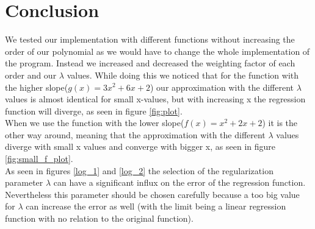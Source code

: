 \documentclass[12pt]{article}
\begin{document}
\section{Conclusion}
We tested our implementation with different functions without increasing the order of our polynomial as we would have to change the whole implementation of the program. Instead we increased and decreased the weighting factor of each order and our $\lambda$ values. While doing this we noticed that for the function with the higher slope($g(x) = 3x^2 + 6x + 2$) our approximation with the different $\lambda$ values is almost identical for small x-values, but with increasing x the regression function will diverge, as seen in figure \ref{fig:plot}. \\
When we use the function with the lower slope($f(x) = x^2 + 2x + 2$) it is the other way around, meaning that the approximation with the different $\lambda$ values diverge with small x values and converge with bigger x, as seen in figure \ref{fig:small_f_plot}. \\
As seen in figures \ref{log_1} and \ref{log_2} the selection of the regularization parameter $\lambda$ can have a significant influx on the error of the regression function. Nevertheless this parameter should be chosen carefully because a too big value for $\lambda$ can increase the error as well (with the limit being a linear regression function with no relation to the original function).
\end{document}
